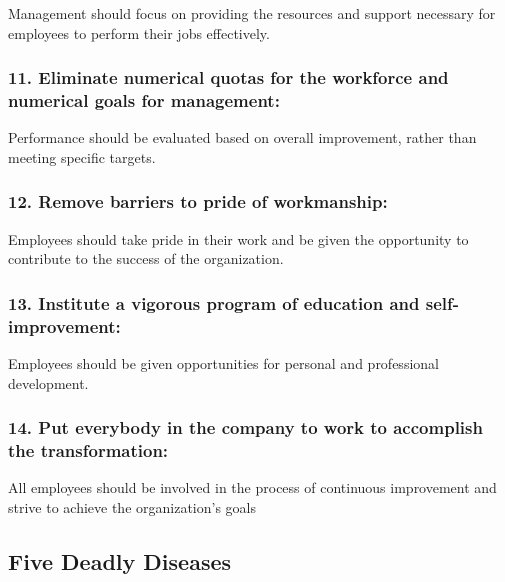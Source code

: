 \documentclass[11pt]{article}
\begin{document}
Management should focus on providing the resources and support necessary
for employees to perform their jobs effectively.

\hypertarget{eliminate-numerical-quotas-for-the-workforce-and-numerical-goals-for-management}{%
\subsubsection{11. Eliminate numerical quotas for the workforce and
numerical goals for
management:}\label{eliminate-numerical-quotas-for-the-workforce-and-numerical-goals-for-management}}

Performance should be evaluated based on overall improvement, rather
than meeting specific targets.

\hypertarget{remove-barriers-to-pride-of-workmanship}{%
\subsubsection{12. Remove barriers to pride of
workmanship:}\label{remove-barriers-to-pride-of-workmanship}}

Employees should take pride in their work and be given the opportunity
to contribute to the success of the organization.

\hypertarget{institute-a-vigorous-program-of-education-and-self-improvement}{%
\subsubsection{13. Institute a vigorous program of education and
self-improvement:}\label{institute-a-vigorous-program-of-education-and-self-improvement}}

Employees should be given opportunities for personal and professional
development.

\hypertarget{put-everybody-in-the-company-to-work-to-accomplish-the-transformation}{%
\subsubsection{14. Put everybody in the company to work to accomplish
the
transformation:}\label{put-everybody-in-the-company-to-work-to-accomplish-the-transformation}}

All employees should be involved in the process of continuous
improvement and strive to achieve the organization's goals

\hypertarget{five-deadly-diseases}{%
\subsection{Five Deadly Diseases}\label{five-deadly-diseases}}
\end{document}
